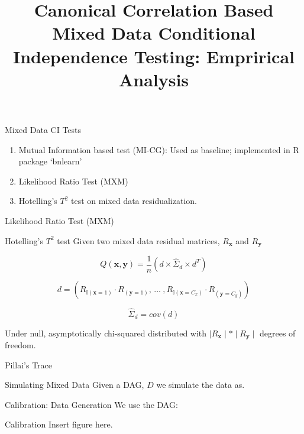 \documentclass{beamer}
\begin{document}
\title[]{Canonical Correlation Based Mixed Data Conditional Independence Testing: Emprirical Analysis}
\author{}
\date{}

\maketitle

\begin{frame}{Mixed Data CI Tests}
	\begin{enumerate}
		\item Mutual Information based test (MI-CG): Used as baseline; implemented in R package `bnlearn'
		\item Likelihood Ratio Test (MXM)
		\item Hotelling's $T^2$ test on mixed data residualization.
	\end{enumerate}
\end{frame}

\begin{frame}{Likelihood Ratio Test (MXM)}
\end{frame}

\begin{frame}{Hotelling's $ T^2 $ test}
Given two mixed data residual matrices, $ R_\mathbf{x} $ and $ R_\mathbf{y} $

$$ Q(\mathbf{x}, \mathbf{y}) = \frac{1}{n} \left( d \times \hat{\Sigma}_d \times d^T \right) $$


$$
d = (R_{\mathbb{I}(\mathbf{x}=1)} \cdot R_{(\mathbf{y}=1)}, \, \ldots \ ,
R_{\mathbb{I}(\mathbf{x}=C_x)} \cdot R_{(\mathbf{y}=C_y)} )
$$

$$ \hat{\Sigma}_d = cov(d) $$

Under null, asymptotically chi-squared distributed with $ \mid R_\mathbf{x} \mid * \mid R_\mathbf{y} \mid $ degrees of freedom.

\end{frame}

\begin{frame}{Pillai's Trace}
\end{frame}

\begin{frame}{Simulating Mixed Data}
	Given a DAG, $ D $ we simulate the data as.
\end{frame}

\begin{frame}{Calibration: Data Generation}
	We use the DAG:
\end{frame}

\begin{frame}{Calibration}
	Insert figure here.
\end{frame}
\end{document}
